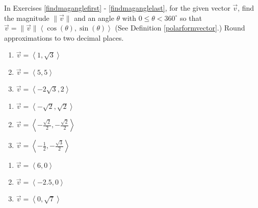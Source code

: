 In Exercises \ref{findmaganglefirst} - \ref{findmaganglelast}, for the given vector $\vec{v}$, find the magnitude $\|\vec{v}\|$ and an angle $\theta$ with $0 \leq \theta < 360^{\circ}$ so that $\vec{v} = \|\vec{v}\| \left<\cos(\theta), \sin(\theta) \right>$ (See Definition \ref{polarformvector}.)  Round approximations to two decimal places.

\begin{multicols}{3}

\begin{enumerate}

\setcounter{enumi}{\value{HW}}

\item  $\vec{v} = \left<1,\sqrt{3}\right>$ \label{findmaganglefirst} 
\item $\vec{v} = \left<5,5\right>$
\item $\vec{v} = \left<-2\sqrt{3}, 2 \right>$

\setcounter{HW}{\value{enumi}}

\end{enumerate}

\end{multicols}

\begin{multicols}{3}

\begin{enumerate}

\setcounter{enumi}{\value{HW}}

\item $\vec{v} = \left<-\sqrt{2}, \sqrt{2} \right>$
\item $\vec{v} = \left<-\frac{\sqrt{2}}{2}, -\frac{\sqrt{2}}{2}\right>$
\item $\vec{v} = \left<-\frac{1}{2}, -\frac{\sqrt{3}}{2}  \right>$

\setcounter{HW}{\value{enumi}}

\end{enumerate}

\end{multicols}

\begin{multicols}{3}

\begin{enumerate}

\setcounter{enumi}{\value{HW}}

\item $\vec{v} = \left<6, 0\right>$
\item $\vec{v} = \left<-2.5, 0\right>$
\item $\vec{v} = \left<0, \sqrt{7} \right>$

\setcounter{HW}{\value{enumi}}

\end{enumerate}

\end{multicols}

